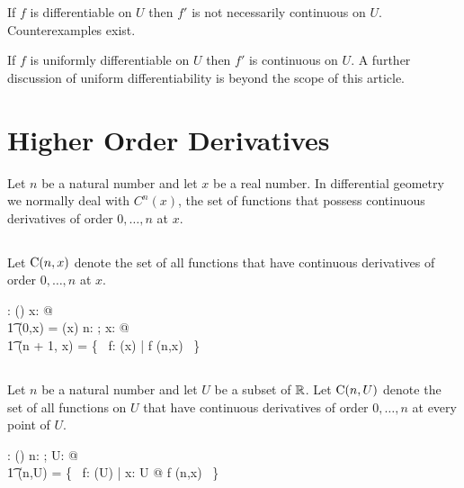 \documentclass[11pt, oneside]{article}
\begin{document}
\begin{remark}
If $f$ is differentiable on $U$ then $f'$ is not necessarily continuous on $U$.
Counterexamples exist.
\end{remark}

\begin{remark}
If $f$ is uniformly differentiable on $U$ then $f'$ is continuous on $U$.
A further discussion of uniform differentiability is beyond the scope of this article.
\end{remark}

\section{Higher Order Derivatives}

Let $n$ be a natural number and let $x$ be a real number.
In differential geometry we normally deal with $C^n(x)$, the set of functions
that possess continuous derivatives of order $0, \ldots, n$ at $x$.

\subsection{}

Let $\operatorname{C}(n,x)$ denote the set of all functions that have continuous derivatives of order $0, \ldots, n$ at $x$.

\begin{axdef}
	\CnR: \nat \cross \R \fun \power(\R \pfun \R)
\where
	\forall x: \R @ \\
	\t1	\CnR(0,x) = \CzeroR(x)
\also
	\forall n: \nat; x: \R @ \\
	\t1	\CnR(n + 1, x) = \{~ f: \diffR(x) | \derivF f \in \CnR(n,x) ~\}
\end{axdef}

\subsection{}

Let $n$ be a natural number and let $U$ be a subset of $\mathbb{R}$.
Let $\operatorname{C}(n,U)$ denote the set of all functions on $U$ that have continuous derivatives of order $0, \ldots, n$
at every point of $U$.

\begin{axdef}
	\CnPR: \nat \cross \power \R \fun \power(\R \pfun \R)
\where
	\forall n: \nat; U: \power \R @ \\
	\t1	\CnPR(n,U) = \{~ f: \FunPR(U) | \forall x: U @ f \in \CnR(n,x) ~\}
\end{axdef}
\end{document}
